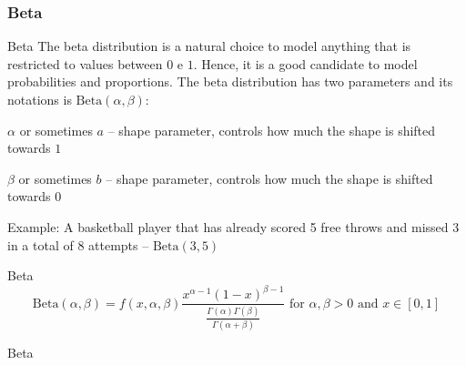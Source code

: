 \subsubsection{Beta}
\begin{frame}{Beta}
	The beta distribution is a natural choice to model anything that is
	restricted to values between $0$ e $1$.
	Hence, it is a good candidate to model probabilities and proportions.
	\vfill
	The beta distribution has two parameters and its notations is
	$\text{Beta} (\alpha, \beta)$:
	\begin{vfilleditems}
		\item $\alpha$ or sometimes $a$ -- shape parameter,
		controls how much the shape is shifted towards $1$
		\item $\beta$ or sometimes $b$ -- shape parameter,
		controls how much the shape is shifted towards $0$
	\end{vfilleditems}
	\vfill
	Example: A basketball player that has already scored 5 free throws and
	missed 3 in a total of 8 attempts -- $\text{Beta}(3, 5)$
\end{frame}

\begin{frame}{Beta}
	$$\text{Beta} (\alpha, \beta) = f(x, \alpha, \beta) \frac{x^{\alpha-1}(1-x)^{\beta-1}} {\frac{\Gamma (\alpha )\Gamma (\beta )}{\Gamma (\alpha +\beta )}} \text{ for $\alpha,\beta > 0$ and $x \in [0, 1]$}$$
\end{frame}

\begin{frame}{Beta}
	\centering
\end{frame}
